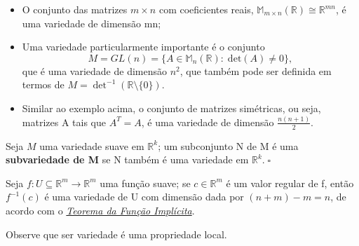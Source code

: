 \documentclass[../differential_topology.tex]{subfiles}
\begin{document}
\begin{example}
\begin{itemize}
		\item[6)] O conjunto das matrizes \(m\times n\) com coeficientes reais, \(\mathbb{M}_{m\times n}(\mathbb{R})\cong \mathbb{R}^{mn}\), é uma variedade de dimensão mn;
		\item[7)] Uma variedade particularmente importante é o conjunto
		      \[
			      M = GL(n) = \{A\in \mathbb{M}_{n}(\mathbb{R}):\; \mathrm{det}(A)\neq 0\},
		      \]
		      que é uma variedade de dimensão \(n^{2}\), que também pode ser definida em termos de \(M = \det^{-1}{(\mathbb{R}\setminus{\{0\}})}\).
		\item[8)] Similar ao exemplo acima, o conjunto de matrizes simétricas, ou seja, matrizes A tais que \(A^{T}=A\), é uma variedade de dimensão \(\frac{n(n+1)}{2}\).
	\end{itemize}
\end{example}
\begin{def*}
	Seja \(M\) uma variedade suave em \(\mathbb{R}^{k}\); um subconjunto N de M é uma \textbf{subvariedade de M} se N também é uma variedade em \(\mathbb{R}^{k}.\; \square\)
\end{def*}
\begin{example}
	Seja \(f:U\subseteq \mathbb{R}^{m}\rightarrow \mathbb{R}^{m}\) uma função suave; se \(c\in \mathbb{R}^{m}\) é um valor regular de f, então \(f^{-1}(c)\) é uma variedade de U com dimensão dada por \((n+m)-m = n\), de acordo com o \hyperlink{implicit_function_theorem}{\textit{Teorema da Função Implícita}}.
\end{example}
Observe que ser variedade é uma propriedade local.
\end{document}
